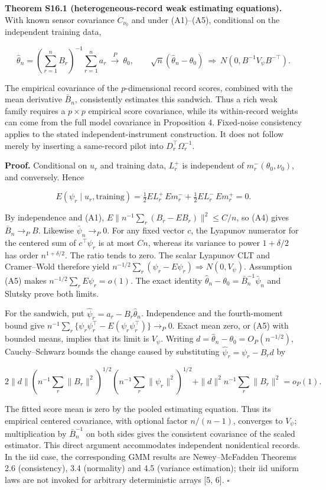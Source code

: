 \documentclass[
  american,
  11pt,
]{article}
\begin{document}
\textbf{Theorem S16.1 (heterogeneous-record weak estimating equations).}
With known sensor covariance \(C_{\nu_0}\) and under (A1)--(A5),
conditional on the independent training data,

\[
\widehat\theta_n=\left(\sum_{r=1}^n B_r\right)^{-1}\sum_{r=1}^n a_r
\ \xrightarrow{P}\ \theta_0,
\qquad
\sqrt n(\widehat\theta_n-\theta_0)
\ \Rightarrow\ N(0,B^{-1}V_\psi B^{-\top}).
\]

The empirical covariance of the \(p\)-dimensional record scores,
combined with the mean derivative \(\bar B_n\), consistently estimates
this sandwich. Thus a rich weak family requires a \(p\times p\)
empirical score covariance, while its within-record weights can come
from the full model covariance in Proposition 4. Fixed-noise consistency
applies to the stated independent-instrument construction. It does not
follow merely by inserting a same-record pilot into
\(D_r^\top\Omega_r^{-1}\).

\textbf{Proof.} Conditional on \(u_r\) and training data, \(L_r^+\) is
independent of \(m_r^-(\theta_0,\nu_0)\), and conversely. Hence

\[
E(\psi_r\mid u_r,\text{training})
=\tfrac12 E L_r^+\,E m_r^-+
\tfrac12 E L_r^-\,E m_r^+=0.
\]

By independence and (A1), \(E\|n^{-1}\sum_r(B_r-E B_r)\|^2\le C/n\), so
(A4) gives \(\bar B_n\to_P B\). Likewise \(\bar\psi_n\to_P0\). For any
fixed vector \(c\), the Lyapunov numerator for the centered sum of
\(c^\top\psi_r\) is at most \(Cn\), whereas its variance to power
\(1+\delta/2\) has order \(n^{1+\delta/2}\). The ratio tends to zero.
The scalar Lyapunov CLT and Cramer--Wold therefore yield
\(n^{-1/2}\sum_r(\psi_r-E\psi_r)\Rightarrow N(0,V_\psi)\). Assumption
(A5) makes \(n^{-1/2}\sum_rE\psi_r=o(1)\). The exact identity
\(\widehat\theta_n-\theta_0=\bar B_n^{-1}\bar\psi_n\) and Slutsky prove
both limits.

For the sandwich, put \(\widehat\psi_r=a_r-B_r\widehat\theta_n\).
Independence and the fourth-moment bound give
\(n^{-1}\sum_r\{\psi_r\psi_r^\top-E(\psi_r\psi_r^\top)\}\to_P0\). Exact
mean zero, or (A5) with bounded means, implies that its limit is
\(V_\psi\). Writing \(d=\widehat\theta_n-\theta_0=O_P(n^{-1/2})\),
Cauchy--Schwarz bounds the change caused by substituting
\(\widehat\psi_r=\psi_r-B_rd\) by

\[
2\|d\|\left(n^{-1}\sum_r\|B_r\|^2\right)^{1/2}
\left(n^{-1}\sum_r\|\psi_r\|^2\right)^{1/2}
+\|d\|^2 n^{-1}\sum_r\|B_r\|^2=o_P(1).
\]

The fitted score mean is zero by the pooled estimating equation. Thus
its empirical centered covariance, with optional factor \(n/(n-1)\),
converges to \(V_\psi\); multiplication by \(\bar B_n^{-1}\) on both
sides gives the consistent covariance of the scaled estimator. This
direct argument accommodates independent nonidentical records. In the
iid case, the corresponding GMM results are Newey--McFadden Theorems 2.6
(consistency), 3.4 (normality) and 4.5 (variance estimation); their iid
uniform laws are not invoked for arbitrary deterministic arrays {[}5,
6{]}. \(\square\)
\end{document}
